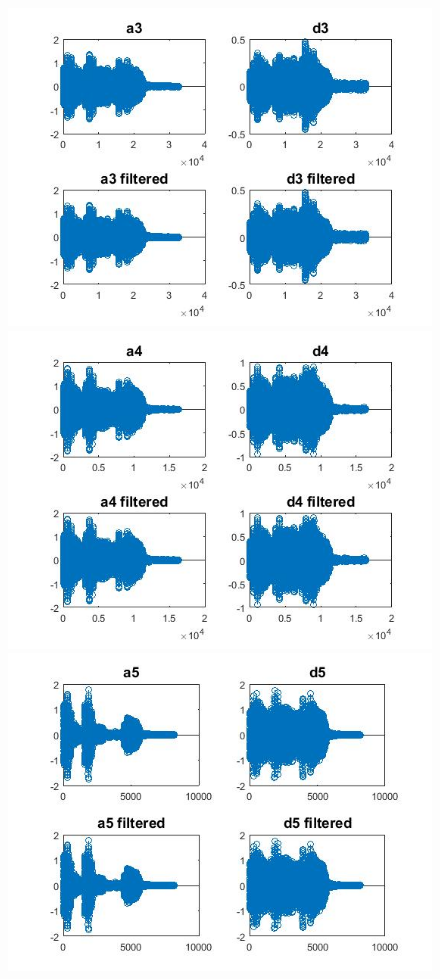 \documentclass{article}
\begin{document}
\begin{figure}[H]
\includegraphics[scale=.5]{a3d3}
\includegraphics[scale=.5]{a4d4}
\includegraphics[scale=.5]{a5d5}
  \end{figure}
\end{document}
